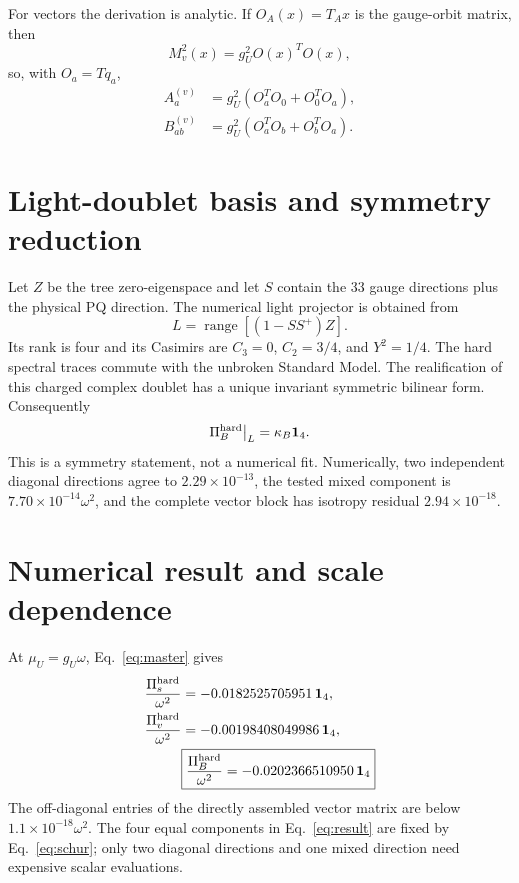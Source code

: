 \documentclass[11pt]{article}
\newcommand{\PiB}{\Pi_{B}^{\rm hard}}
\begin{document}
For vectors the derivation is analytic.  If
\(O_A(x)=T_Ax\) is the gauge-orbit matrix, then
\begin{equation}
 M_v^2(x)=g_U^2O(x)^TO(x),
 \label{eq:vectormass}
\end{equation}
so, with \(O_a=Tq_a\),
\begin{align}
 A_a^{(v)}&=g_U^2(O_a^TO_0+O_0^TO_a),\nonumber\\
 B_{ab}^{(v)}&=g_U^2(O_a^TO_b+O_b^TO_a).
 \label{eq:vectorjet}
\end{align}

\section{Light-doublet basis and symmetry reduction}

Let \(Z\) be the tree zero-eigenspace and let \(S\) contain the 33 gauge
directions plus the physical PQ direction.  The numerical light projector is
obtained from
\begin{equation}
 L=\operatorname{range}\!\left[(1-SS^+)Z\right].
 \label{eq:lightprojector}
\end{equation}
Its rank is four and its Casimirs are
\(C_3=0\), \(C_2=3/4\), and \(Y^2=1/4\).  The hard spectral traces commute
with the unbroken Standard Model.  The realification of this charged complex
doublet has a unique invariant symmetric bilinear form.  Consequently
\begin{equation}
 \PiB\big|_L=\kappa_B\bm1_4.
 \label{eq:schur}
\end{equation}
This is a symmetry statement, not a numerical fit.  Numerically, two
independent diagonal directions agree to \(2.29\times10^{-13}\), the tested
mixed component is \(7.70\times10^{-14}\omega^2\), and the complete vector
block has isotropy residual \(2.94\times10^{-18}\).

\section{Numerical result and scale dependence}

At \(\mu_U=g_U\omega\), Eq.~\eqref{eq:master} gives
\begin{align}
 \frac{\Pi_s^{\rm hard}}{\omega^2}
 &=-0.0182525705951\,\bm1_4,\nonumber\\
 \frac{\Pi_v^{\rm hard}}{\omega^2}
 &=-0.00198408049986\,\bm1_4,\nonumber\\
 &\boxed{\frac{\PiB}{\omega^2}
 =-0.0202366510950\,\bm1_4}
 \label{eq:result}
\end{align}
The off-diagonal entries of the directly assembled vector matrix are below
\(1.1\times10^{-18}\omega^2\).  The four equal components in
Eq.~\eqref{eq:result} are fixed by Eq.~\eqref{eq:schur}; only two diagonal
directions and one mixed direction need expensive scalar evaluations.
\end{document}
